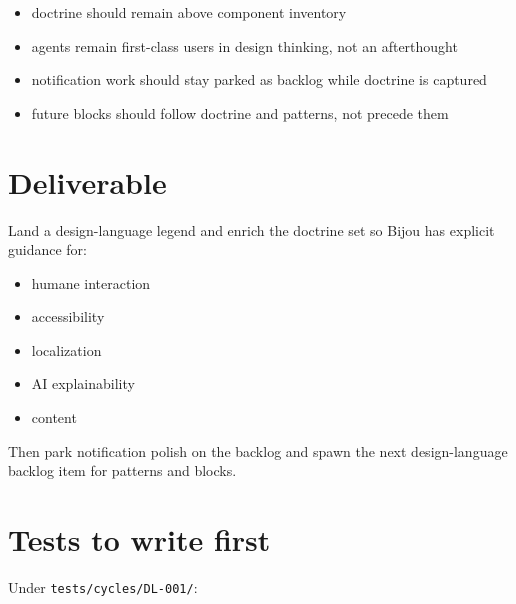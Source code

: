 \begin{itemize}
\tightlist
\item
  doctrine should remain above component inventory
\item
  agents remain first-class users in design thinking, not an afterthought
\item
  notification work should stay parked as backlog while doctrine is captured
\item
  future blocks should follow doctrine and patterns, not precede them
\end{itemize}

\section{Deliverable}\label{record-168-deliverable}

Land a design-language legend and enrich the doctrine set so Bijou has explicit guidance for:

\begin{itemize}
\tightlist
\item
  humane interaction
\item
  accessibility
\item
  localization
\item
  AI explainability
\item
  content
\end{itemize}

Then park notification polish on the backlog and spawn the next design-language backlog item for patterns and blocks.

\section{Tests to write first}\label{record-168-tests-to-write-first}

Under \texttt{t\allowbreak{}e\allowbreak{}s\allowbreak{}t\allowbreak{}s\allowbreak{}/\allowbreak{}c\allowbreak{}y\allowbreak{}c\allowbreak{}l\allowbreak{}e\allowbreak{}s\allowbreak{}/\allowbreak{}D\allowbreak{}L\allowbreak{}-\allowbreak{}0\allowbreak{}0\allowbreak{}1\allowbreak{}/}:

